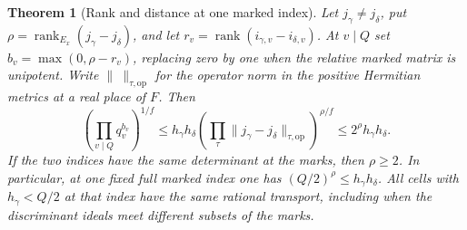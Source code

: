\documentclass[a4paper,11pt]{article}
\newtheorem{theorem}[proposition]{Theorem}
\theoremstyle{definition}
\theoremstyle{remark}
\numberwithin{equation}{section}
\begin{document}
\begin{theorem}[Rank and distance at one marked index]
\leavevmode\label{thm:hyperplanerank603}
Let \(j_\gamma\ne j_\delta\), put
\(\rho=\operatorname{rank}_{E_x}(j_\gamma-j_\delta)\), and
let \(r_v=\operatorname{rank}(i_{\gamma,v}-i_{\delta,v})\).
At \(v\mid Q\) set \(b_v=\max(0,\rho-r_v)\), replacing zero
by one when the relative marked matrix is unipotent. Write
\(\|\ \|_{\tau,\mathrm{op}}\) for the operator norm in the
positive Hermitian metrics at a real place of \(F\). Then
\[
 \left(\prod_{v\mid Q}q_v^{b_v}\right)^{1/f}
 \le h_\gamma h_\delta
       \left(\prod_{\tau}\|j_\gamma-j_\delta\|_{\tau,\mathrm{op}}
                          \right)^{\rho/f}
 \le 2^\rho h_\gamma h_\delta .
\]
If the two indices have the same determinant at the marks,
then \(\rho\ge2\). In particular, at one fixed full marked
index one has \((Q/2)^\rho\le h_\gamma h_\delta\). All cells
with \(h_\gamma<Q/2\) at that index have the same rational
transport, including when the discriminant ideals meet
different subsets of the marks.
\end{theorem}
\end{document}
